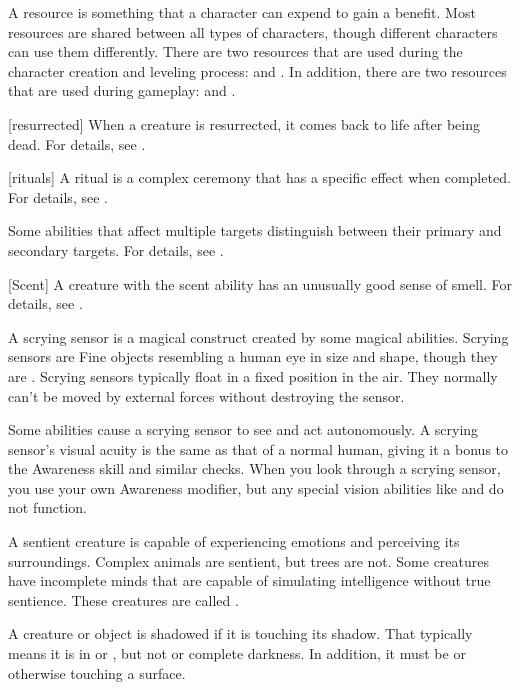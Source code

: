  A resource is something that a character can expend to gain a benefit.
Most resources are shared between all types of characters, though different characters can use them differently.
There are two resources that are used during the character creation and leveling process:  and .
In addition, there are two resources that are used during gameplay:  and .

[resurrected] When a creature is resurrected, it comes back to life after being dead.
For details, see .

[rituals] A ritual is a complex \magical ceremony that has a specific effect when completed.
For details, see .

 Some abilities that affect multiple targets distinguish between their primary and secondary targets.
For details, see .

[Scent] A creature with the scent ability has an unusually good sense of smell.
For details, see .

 A scrying sensor is a magical construct created by some magical abilities.
Scrying sensors are Fine objects resembling a human eye in size and shape, though they are .
Scrying sensors typically float in a fixed position in the air.
They normally can't be moved by external forces without destroying the sensor.

Some abilities cause a scrying sensor to see and act autonomously.
A scrying sensor's visual acuity is the same as that of a normal human, giving it a  bonus to the Awareness skill and similar checks.
When you look through a scrying sensor, you use your own Awareness modifier, but any special vision abilities like  and  do not function.

 A sentient creature is capable of experiencing emotions and perceiving its surroundings.
Complex animals are sentient, but trees are not.
Some creatures have incomplete minds that are capable of simulating intelligence without true sentience.
These creatures are called .

 A creature or object is shadowed if it is touching its shadow.
That typically means it is in  or , but not  or complete darkness.
In addition, it must be  or otherwise touching a surface.

